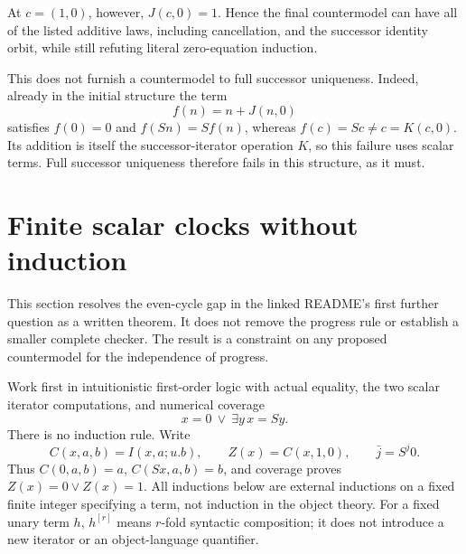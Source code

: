 \documentclass[11pt,letterpaper]{article}
\theoremstyle{definition}
\begin{document}
At $c=(1,0)$, however, $J(c,0)=1$. Hence the final countermodel can have
all of the listed additive laws, including cancellation, and the
successor identity orbit, while still refuting literal zero-equation
induction.

This does not furnish a countermodel to full successor uniqueness.
Indeed, already in the initial structure the term
\[
 f(n)=n+J(n,0)
\]
satisfies $f(0)=0$ and $f(Sn)=Sf(n)$, whereas
$f(c)=Sc\ne c=K(c,0)$. Its addition is itself the successor-iterator
operation $K$, so this failure uses scalar terms. Full successor
uniqueness therefore fails in this structure, as it must.

\section{Finite scalar clocks without induction}
\label{sec:finite-clocks}

This section resolves the even-cycle gap in the linked README's first
further question as a written theorem. It does not remove the progress rule or establish a smaller
complete checker. The result is a constraint on any proposed countermodel
for the independence of progress.

Work first in intuitionistic first-order logic with actual equality, the
two scalar iterator computations, and numerical coverage
\[
 x=0\ \lor\ \exists y\,x=Sy.
\]
There is no induction rule. Write
\[
 C(x,a,b)=I(x,a;u.b),\qquad Z(x)=C(x,1,0),\qquad
 \bar j=S^j0.
\]
Thus $C(0,a,b)=a$, $C(Sx,a,b)=b$, and coverage proves
$Z(x)=0\lor Z(x)=1$. All inductions below are external inductions on a
fixed finite integer specifying a term, not induction in the object theory.
For a fixed unary term $h$, $h^{[r]}$ means $r$-fold syntactic composition;
it does not introduce a new iterator or an object-language quantifier.
\end{document}
